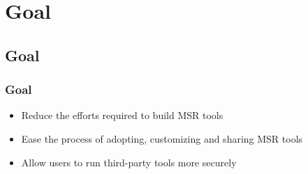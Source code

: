 \section{Goal}
    \subsection{Goal}
        \begin{frame}
            \frametitle{Goal}
                 \begin{itemize}
                    \item Reduce the efforts required to build MSR tools
                    \item Ease the process of adopting, customizing and sharing MSR tools
                    \item Allow users to run third-party tools more securely
                 \end{itemize}

        \end{frame}

